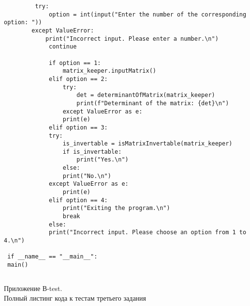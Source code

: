 \begin{lstlisting}
		 try:
			 option = int(input("Enter the number of the corresponding option: "))
		except ValueError:
			print("Incorrect input. Please enter a number.\n")
			 continue
			 
			 if option == 1:
				 matrix_keeper.inputMatrix()
			 elif option == 2:
				 try:
					 det = determinantOfMatrix(matrix_keeper)
					 print(f"Determinant of the matrix: {det}\n")
				 except ValueError as e:
				 print(e)
			 elif option == 3:
			 try:
				 is_invertable = isMatrixInvertable(matrix_keeper)
				 if is_invertable:
					 print("Yes.\n")
				 else:
				 print("No.\n")
			 except ValueError as e:
				 print(e)
			 elif option == 4:
				 print("Exiting the program.\n")
				 break
			 else:
			 print("Incorrect input. Please choose an option from 1 to 4.\n")
	 
 if __name__ == "__main__":
 main()
 
 \end{lstlisting}

\centering\begin{large}
	{Приложение В-test.\\
		Полный листинг кода к тестам третьего задания}\\ \\
\end{large}

